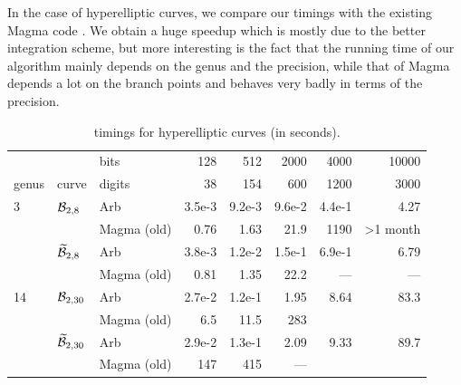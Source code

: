 \documentclass[main.tex]{subfiles}
\begin{document}
  In the case of hyperelliptic curves, we compare our timings with the existing
  Magma code \cite{vanWamelen06}. We obtain a huge speedup which is mostly due
  to the better integration scheme, but more interesting is the fact that the
  running time of our algorithm mainly depends on the genus and the precision,
  while that of Magma depends a lot on the branch points and behaves very badly
  in terms of the precision.

  \begin{table}[H]
      \begin{center}
          \begin{tabular}{lllrrrrr}
              \toprule
              & & \hfill bits & 128 & 512 & 2000 & 4000 & 10000 \\
              genus & curve & \hfill digits & 38 & 154 & 600 & 1200 & 3000 \\
              \midrule
              3 & $\mathcal{B}_{2,8}$
              & Arb   & 3.5e-3 & 9.2e-3 & 9.6e-2 & 4.4e-1 & 4.27 \\
              & & Magma (old) & 0.76 & 1.63 & 21.9 & 1190 & >1 month \\
              \cmidrule{3-8}
              & $\widetilde{\mathcal{B}}_{2,8}$
              & Arb & 3.8e-3 & 1.2e-2 & 1.5e-1 & 6.9e-1 & 6.79 \\
              & & Magma (old) & 0.81 & 1.35 & 22.2 & --- & --- \\
              \midrule
              14 & $\mathcal{B}_{2,30}$
              & Arb & 2.7e-2 & 1.2e-1 & 1.95 & 8.64 & 83.3 \\
              & & Magma (old) & 6.5 & 11.5 & 283 & \\
              \cmidrule{3-8}
              & $\widetilde{\mathcal{B}}_{2,30}$
              & Arb & 2.9e-2 & 1.3e-1 & 2.09 & 9.33 & 89.7 \\
              & & Magma (old) & 147 & 415 & --- & \\
              \bottomrule
          \end{tabular}
          \caption{timings for hyperelliptic curves (in seconds).}
      \end{center}
  \end{table}

  \biblio
  
\end{document}
